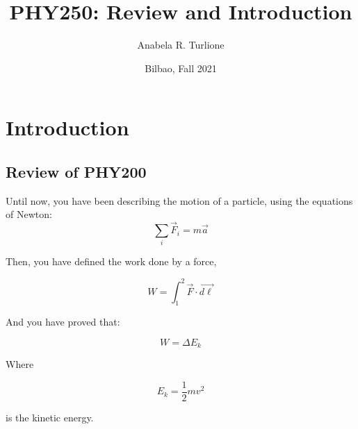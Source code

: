 \documentclass[]{beamer}
\title{PHY250: Review and Introduction}    %
\author{Anabela R. Turlione}                 %
\institute{Digipen Institute}      %
\date{Bilbao, Fall 2021}                    %
\begin{document}
\begin{frame}
  \titlepage
\end{frame}

\section[]{}

\begin{frame}
  \tableofcontents
\end{frame}

\section{Introduction}
\subsection{Review of PHY200}

\begin{frame}

  Until now, you have been describing the motion of a particle, using the equations of Newton:
\pause
\vspace{5mm}
\begin{equation}
  \sum_i\vec{F}_i=m\vec{a}
\end{equation}


\end{frame}





\begin{frame}

Then, you have defined the work done by a force,

\begin{equation}
  W=\int^2_1\vec{F}\cdot \vec{d\ell}
\end{equation}

\pause

And you have proved that:

\begin{equation}
  W=\Delta E_k
\end{equation}
\pause

Where

\begin{equation}
  E_k=\frac{1}{2}mv^2
\end{equation}

is the kinetic energy.
\end{frame}
\end{document}
